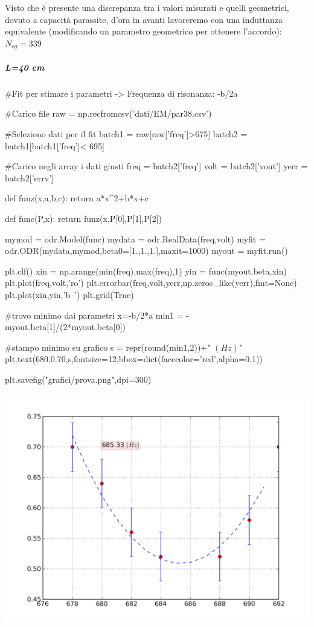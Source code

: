 Visto che è presente una discrepanza tra i valori misurati e quelli geometrici, dovuto a capacità parassite, d'ora in avanti lavoreremo con una induttanza equivalente (modificando un parametro geometrico per ottenere l'accordo): $N_{eq} = 339$

\subparagraph*{L=40 cm}
\begin{sagesilent}
#Fit per stimare i parametri -> Frequenza di risonanza: -b/2a

#Carico file
raw = np.recfromcsv('dati/EM/par38.csv')

#Seleziono dati per il fit
batch1 = raw[raw['freq']>675]
batch2 = batch1[batch1['freq']< 695]

#Carico negli array i dati giusti
freq = batch2['freq']
volt = batch2['vout']
yerr = batch2['errv']



def funz(x,a,b,c):
    return a*x^2+b*x+c

def func(P,x):
    return funz(x,P[0],P[1],P[2])

mymod = odr.Model(func)
mydata = odr.RealData(freq,volt)
myfit = odr.ODR(mydata,mymod,beta0=[1.,1.,1.],maxit=1000)
myout = myfit.run()

plt.clf()
xin = np.arange(min(freq),max(freq),1)
yin = func(myout.beta,xin)
plt.plot(freq,volt,'ro')
plt.errorbar(freq,volt,yerr,np.zeros_like(yerr),fmt=None)
plt.plot(xin,yin,'b--')
plt.grid(True)

#trovo minimo dai parametri x=-b/2*a
min1 = -myout.beta[1]/(2*myout.beta[0]) 

#stampo minimo su grafico
s = repr(round(min1,2))+" $(Hz)$"
plt.text(680,0.70,s,fontsize=12,bbox=dict(facecolor='red',alpha=0.1))

plt.savefig("grafici/prova.png",dpi=300)

\end{sagesilent}

\includegraphics[scale=0.75]{grafici/prova.png}


